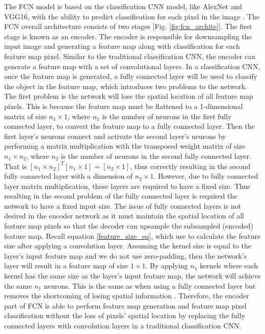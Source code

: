 The FCN model is based on the classification CNN model, like AlexNet and VGG16, with the ability to predict classification for each pixel in the image \cite{mask_rcnn_2017}. The FCN overall architecture consists of two stages [Fig. \ref{fig:fcn_archite}]. The first stage is known as an encoder. The encoder is responsible for downsampling the input image and generating a feature map along with classification for each feature map pixel. Similar to the traditional classification CNN, the encoder can generate a feature map with a set of convolutional layers. In a classification CNN, once the feature map is generated, a fully connected layer will be used to classify the object in the feature map, which introduces two problems to the network. The first problem is the network will lose the spatial location of all feature map pixels. This is because the feature map must be flattened to a 1-dimensional matrix of size $n_1 \times 1$, where $n_1$ is the number of neurons in the first fully connected layer, to convert the feature map to a fully connected layer. Then the first layer's neurons connect and activate the second layer's neurons by performing a matrix multiplication with the transposed weight matrix of size $n_1 \times n_2$, where $n_2$ is the number of neurons in the second fully connected layer. That is $[n_1 \times n_2]^T [n_1 \times 1] = [n_2 \times 1]$, thus correctly resulting in the second fully connected layer with a dimension of $n_2 \times 1$. However, due to fully connected layer matrix multiplication, these layers are required to have a fixed size. Thus resulting in the second problem of the fully connected layer is required the network to have a fixed input size. The issue of fully connected layers is not desired in the encoder network as it must maintain the spatial location of all feature map pixels so that the decoder can upsample the subsampled (encoded) feature map. Recall equation \ref{feature_size_eq}, which use to calculate the feature size after applying a convolution layer. Assuming the kernel size is equal to the layer's input feature map and we do not use zero-padding, then the network's layer will result in a feature map of size $1 \times 1$. By applying $n_1$ kernels where each kernel has the same size as the layer's input feature map, the network will achieve the same $n_1$ neurons. This is the same as when using a fully connected layer but removes the shortcoming of losing spatial information \cite{mask_rcnn_2017}. Therefore, the encoder part of FCN is able to perform feature map generation and feature map pixel classification without the loss of pixels' spatial location by replacing the fully connected layers with convolution layers in a traditional classification CNN.

